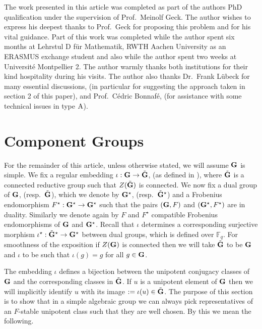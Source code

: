 \documentclass{jt-calcs}
\begin{document}
\begin{acknowledgments}
The work presented in this article was completed as part of the authors PhD qualification under the supervision of Prof.\ Meinolf Geck. The author wishes to express his deepest thanks to Prof.\ Geck for proposing this problem and for his vital guidance. Part of this work was completed while the author spent six months at Lehrstul D f\"{u}r Mathematik, RWTH Aachen University as an ERASMUS exchange student and also while the author spent two weeks at Universit\'{e} Montpellier 2. The author warmly thanks both institutions for their kind hospitality during his visits. The author also thanks Dr.\ Frank L\"{u}beck for many essential discussions, (in particular for suggesting the approach taken in section 2 of this paper), and Prof.\ C\'{e}dric Bonnaf\'{e}, (for assistance with some technical issues in type $\operatorname{A}$).
\end{acknowledgments}

\section{Component Groups}\label{sec:comp-groups}
For the remainder of this article, unless otherwise stated, we will assume $\mathbf{G}$ is simple. We fix a regular embedding $\iota : \mathbf{G} \to \tilde{\mathbf{G}}$, (as defined in \cite[\S 7]{lusztig:1988:reductive-groups-with-a-disconnected-centre}), where $\tilde{\mathbf{G}}$ is a connected reductive group such that $Z(\tilde{\mathbf{G}})$ is connected. We now fix a dual group of $\mathbf{G}$, (resp.\ $\tilde{\mathbf{G}}$), which we denote by $\mathbf{G}^{\star}$, (resp.\ $\tilde{\mathbf{G}}^{\star}$) and a Frobenius endomorphism $F^{\star} : \mathbf{G}^{\star} \to \mathbf{G}^{\star}$ such that the pairs $(\mathbf{G},F)$ and $(\mathbf{G}^{\star},F^{\star})$ are in duality. Similarly we denote again by $F$ and $F^{\star}$ compatible Frobenius endomorphisms of $\mathbf{G}$ and $\mathbf{G}^{\star}$. Recall that $\iota$ determines a corresponding surjective morphism $\iota^{\star} : \tilde{\mathbf{G}}^{\star} \to \mathbf{G}^{\star}$ between dual groups, which is defined over $\mathbb{F}_q$. For smoothness of the exposition if $Z(\mathbf{G})$ is connected then we will take $\tilde{\mathbf{G}}$ to be $\mathbf{G}$ and $\iota$ to be such that $\iota(g) = g$ for all $g \in \mathbf{G}$.

The embedding $\iota$ defines a bijection between the unipotent conjugacy classes of $\mathbf{G}$ and the corresponding classes in $\tilde{\mathbf{G}}$. If $u$ is a unipotent element of $\mathbf{G}$ then we will implicitly identify $u$ with its image $:= \iota(u) \in \tilde{\mathbf{G}}$. The purpose of this section is to show that in a simple algebraic group we can always pick representatives of an $F$-stable unipotent class such that they are well chosen. By this we mean the following.
\end{document}
